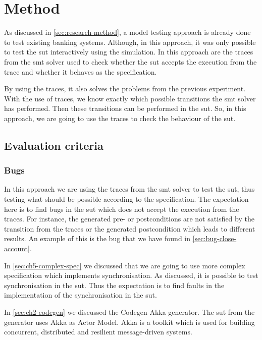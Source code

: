 \section{Method}

As discussed in \autoref{sec:research-method}, a model testing approach is
already done to test existing banking systems. Although, in this approach, it
was only possible to test the \gls{sut} interactively using the simulation. In this
approach are the traces from the \gls{smt} solver used to check whether the
\gls{sut} accepts the execution from the trace and whether it behaves as the
specification.~\cite[p.~5]{stoel_storm_vinju_bosman_2016}

By using the traces, it also solves the problems from the previous experiment.
With the use of traces, we know exactly which possible transitions the
\gls{smt} solver has performed. Then these transitions can be performed in the \gls{sut}.
So, in this approach, we are going to use the traces to check the behaviour of the
\gls{sut}.

\subsection{Evaluation criteria}\label{sec:ch5-eval-criteria}

\subsubsection{Bugs}
In this approach we are using the traces from the \gls{smt} solver to test the
\gls{sut}, thus testing what should be possible according to the specification.
The expectation here is to find bugs in the \gls{sut} which does not accept the
execution from the traces. For instance, the generated pre- or postconditions
are not satisfied by the transition from the traces or the generated
postcondition which leads to different results. An example of this is the bug
that we have found in \autoref{sec:bug-close-account}.

In \autoref{sec:ch5-complex-spec} we discussed that we are going to use more
complex specification which implements synchronisation. As discussed, it is
possible to test synchronisation in the \gls{sut}. Thus the expectation is to
find faults in the implementation of the synchronisation in the \gls{sut}.

In \autoref{sec:ch2-codegen} we discussed the Codegen-Akka generator. The
\gls{sut} from the generator uses Akka as Actor Model. Akka is a toolkit
which is used for building concurrent, distributed and resilient
message-driven systems.~\cite[p.~4]{roestenburg2016akka}

